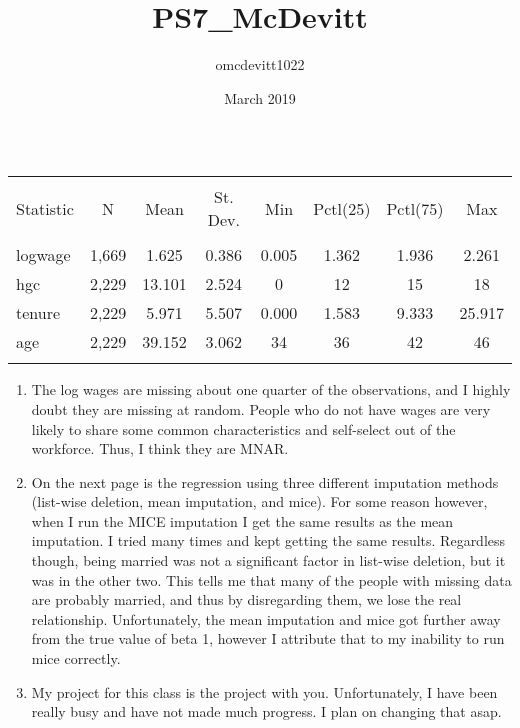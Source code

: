 \documentclass{article}
\title{PS7_McDevitt}
\author{omcdevitt1022 }
\date{March 2019}
\begin{document}
\maketitle

    \begin{table}[!htbp] \centering
  \caption{}
  \label{}
\begin{tabular}{@{\extracolsep{5pt}}lccccccc}
\\[-1.8ex]\hline
\hline \\[-1.8ex]
Statistic & \multicolumn{1}{c}{N} & \multicolumn{1}{c}{Mean} & \multicolumn{1}{c}{St. Dev.} & \multicolumn{1}{c}{Min} & \multicolumn{1}{c}{Pctl(25)} & \multicolumn{1}{c}{Pctl(75)} & \multicolumn{1}{c}{Max} \\
\hline \\[-1.8ex]
logwage & 1,669 & 1.625 & 0.386 & 0.005 & 1.362 & 1.936 & 2.261 \\
hgc & 2,229 & 13.101 & 2.524 & 0 & 12 & 15 & 18 \\
tenure & 2,229 & 5.971 & 5.507 & 0.000 & 1.583 & 9.333 & 25.917 \\
age & 2,229 & 39.152 & 3.062 & 34 & 36 & 42 & 46 \\
\hline \\[-1.8ex]
\end{tabular}
\end{table}

\begin{enumerate}
    \item The log wages are missing about one quarter of the observations, and I highly doubt they are missing at random. People who do not have wages are very likely to share some common characteristics and self-select out of the workforce. Thus, I think they are MNAR.
    \item On the next page is the regression using three different imputation methods (list-wise deletion, mean imputation, and mice). For some reason however, when I run the MICE imputation I get the same results as the mean imputation. I tried many times and kept getting the same results. Regardless though, being married was not a significant factor in list-wise deletion, but it was in the other two. This tells me that many of the people with missing data are probably married, and thus by disregarding them, we lose the real relationship. Unfortunately, the mean imputation and mice got further away from the true value of beta 1, however I attribute that to my inability to run mice correctly.
    \item My project for this class is the project with you. Unfortunately, I have been really busy and have not made much progress. I plan on changing that asap.
\end{enumerate}
\end{document}
